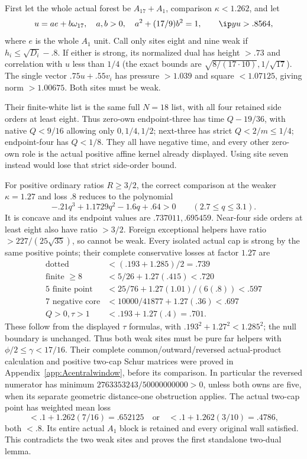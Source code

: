 First let the whole actual forest be \(A_{17}+A_1\), comparison
\(\kappa<1.262\), and let
\[
 u=a e+b\omega_{17},\quad a,b>0,\quad
 a^2+(17/9)b^2=1,\qquad \ip yu>.8564 ,
\]
where \(e\) is the whole \(A_1\) unit.
Call only sites eight and nine weak if
\(h_i\leq\sqrt{D_i}-.8\).
If either is strong, its normalized dual has height \(>.73\)
and correlation with \(u\) less than \(1/4\)
(the exact bounds are \(\sqrt{8/(17\cdot10)},1/\sqrt{17}\)).
The single vector \(.75u+.55v_i\) has pressure \(>1.039\)
and square \(<1.07125\), giving norm \(>1.00675\).
Both sites must be weak.

Their finite-white list is the same full \(N=18\) list,
with all four retained side orders at least eight.
Thus zero-own endpoint-three has time \(Q-19/36\),
with native \(Q<9/16\) allowing only \(0,1/4,1/2\);
next-three has strict \(Q<2/m\leq1/4\);
endpoint-four has \(Q<1/8\).
They all have negative time, and every other zero-own role is
the actual positive affine kernel already displayed.
Using site seven instead would lose that strict side-order bound.

For positive ordinary ratios \(R\geq3/2\), the correct
comparison at the weaker \(\kappa=1.27\) and loss \(.8\)
reduces to the polynomial
\[
 -.21q^3+1.1729q^2-1.6q+.64>0
 \qquad(2.7\leq q\leq3.1).
\]
It is concave and its endpoint values are \(.737011,.695459\).
Near-four side orders at least eight also have ratio \(>3/2\).
Foreign exceptional helpers have ratio
\(>227/(25\sqrt{35})\), so cannot be weak.
Every isolated actual cap is strong by the same positive points;
their complete conservative losses at factor \(1.27\) are
\[
\begin{array}{c|c}
\text{dotted}&<(.193+1.285)/2=.739\\
\text{finite }\geq8&<5/26+1.27(.415)<.720\\
5\text{ finite point}&<25/76+1.27(1.01)/(6(.8))<.597\\
7\text{ negative core}&<10000/41877+1.27(.36)<.697\\
Q>0,\tau>1&<.193+1.27(.4)=.701 .
\end{array}
\]
These follow from the displayed \(\tau\) formulas, with
\(.193^2+1.27^2<1.285^2\);
the null boundary is unchanged.
Thus both weak sites must be pure far helpers with
\(\phi/2\leq\gamma<17/16\).
Their complete common/outward/reversed actual-product calculation
and positive two-cap Schur matrices were proved in
Appendix~\ref{app:Acentralwindow}, before its comparison.
In particular the reversed numerator has minimum
\(2763353243/50000000000>0\), unless both owns are five,
when its separate geometric distance-one obstruction applies.
The actual two-cap point has weighted mean loss
\[
 <.1+1.262(7/16)=.652125
 \quad\text{or}\quad <.1+1.262(3/10)=.4786,
\]
both \(<.8\).
Its entire actual \(A_1\) block is retained and every original wall
satisfied. This contradicts the two weak sites and proves the first
standalone two-dual lemma.

